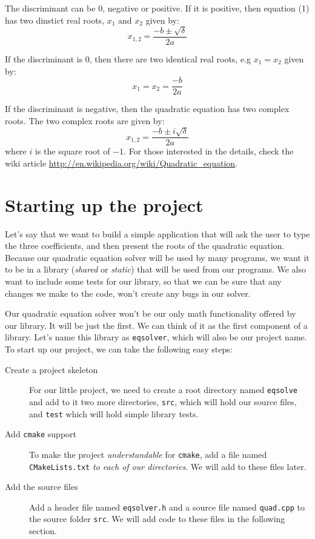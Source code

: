\documentclass[12pt,a4paper]{article}
\begin{document}
The discriminant can be $0$, negative or positive. If it is positive, then equation (1) has two dinstict real roots, $x_1$ and $x_2$ given by:
\[
x_{1,2} = \frac{-b\pm\sqrt{\delta}}{2a}
\]

If the discriminant is $0$, then there are two identical real roots, e.g $x_1=x_2$ given by:
\[
x_1=x_2=\frac{-b}{2a}
\]

If the discriminant is negative, then the quadratic equation has two complex roots. The two complex roots are given by:
\[
x_{1,2}=\frac{-b\pm i\sqrt{\delta}}{2a}
\]
where $i$ is the square root of $-1$. For those interested in the details, check the wiki article \href{http://en.wikipedia.org/wiki/Quadratic\_equation}{http://en.wikipedia.org/wiki/Quadratic\_equation}.

\section{Starting up the project}
Let's say that we want to build a simple application that will ask the user to type the three coefficients, and then present the roots of the quadratic equation. Because our quadratic equation solver will be used by many programs, we want it to be in a library (\emph{shared} or \emph{static}) that will be used from our programs. We also want to include some tests for our library, so that we can be sure that any changes we make to the code, won't create any bugs in our solver. 

Our quadratic equation solver won't be our only math functionality offered by our library. It will be just the first. We can think of it as the first component of a library. Let's name this library as \verb+eqsolver+, which will also be our project name. To start up our project, we can take the following easy steps:

\begin{description}
\item [Create a project skeleton] For our little project, we need to create a root directory named \verb+eqsolve+ and add to it two more directories, \verb+src+, which will hold our source files, and \verb+test+
which will hold simple library tests.
\item [Add \texttt{cmake} support] To make the project \emph{understandable} for \verb+cmake+, add a file named \verb+CMakeLists.txt+ \emph{to each of our directories}. We will add to these files later.
\item [Add the source files] Add a header file named \verb+eqsolver.h+ and a source file named \verb+quad.cpp+ to the source folder \verb+src+. We will add code to these files in the following section. 
\end{description}
\end{document}
